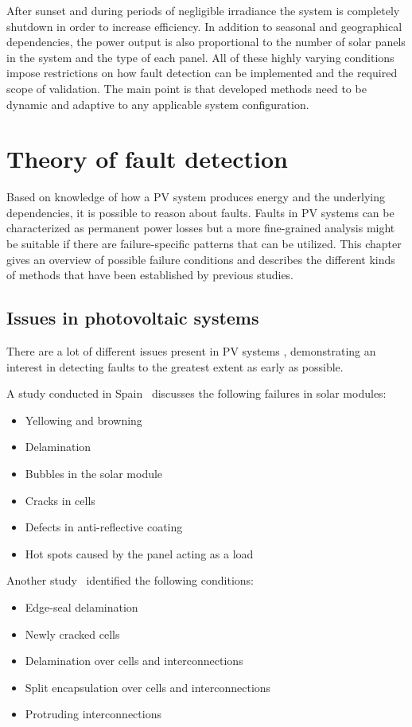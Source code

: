 After sunset and during periods of negligible irradiance the system is completely shutdown in order to increase efficiency.
In addition to seasonal and geographical dependencies, the power output is also proportional to the number of solar panels in the system and the type of each panel.
All of these highly varying conditions impose restrictions on how fault detection can be implemented and the required scope of validation.
The main point is that developed methods need to be dynamic and adaptive to any applicable system configuration.

\chapter{Theory of fault detection}
Based on knowledge of how a PV system produces energy and the underlying dependencies,
it is possible to reason about faults.
Faults in PV systems can be characterized as permanent power losses but a more fine-grained analysis might be suitable if there are failure-specific patterns that can be utilized.
This chapter gives an overview of possible failure conditions and describes the different kinds of methods that have been established by previous studies.

\section{Issues in photovoltaic systems}
There are a lot of different issues present in PV systems \cite{Baltus1997,King2002,Petrone2008}, demonstrating an interest in detecting faults to the greatest extent as early as possible.

A study conducted in Spain~\cite{Munoz2011} discusses the following failures in solar modules:
\begin{itemize}
\item Yellowing and browning
\item Delamination
\item Bubbles in the solar module
\item Cracks in cells
\item Defects in anti-reflective coating
\item Hot spots caused by the panel acting as a load
\end{itemize}

Another study~\cite{Forman1982} identified the following conditions:
\begin{itemize}
\item Edge-seal delamination
\item Newly cracked cells
\item Delamination over cells and interconnections
\item Split encapsulation over cells and interconnections
\item Protruding interconnections
\end{itemize}

